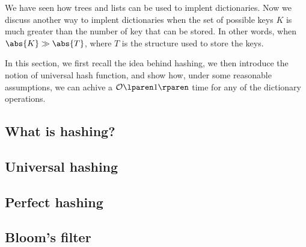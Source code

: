 \documentclass{subfiles}
\begin{document}
    We have seen how trees and lists can be used to implent dictionaries.
        Now we discuss another way to implent dictionaries when the set of possible keys \(K\)
        is much greater than the number of key that can be stored.
        In other words, when \(\abs{K} \gg \abs{T}\), 
        where \(T\) is the structure used to store the keys.

    In this section, we first recall the idea behind hashing, 
        we then introduce the notion of universal hash function,
        and show how, under some reasonable assumptions,
        we can achive a \(\ofO{1}\) time for any of the dictionary operations.

    \subsection{What is hashing?}
    

    \subsection{Universal hashing}
    

    \subsection{Perfect hashing}
    
    
    \subsection{Bloom's filter}
    
\end{document}

